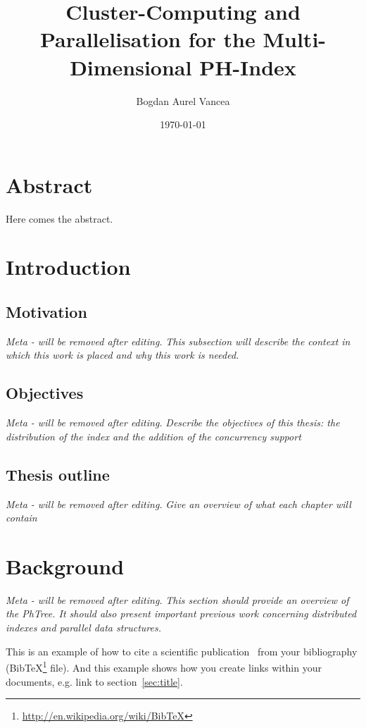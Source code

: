 \documentclass[11pt,a4paper]{globis-book}
\title{Cluster-Computing and Parallelisation for the
    Multi-Dimensional PH-Index}
\author{Bogdan Aurel Vancea}
\institute{Institute of Information Systems}
\date{\today}
\begin{document}
\frontmatter
\maketitlepage
\cleardoublepage
{}

\chapter*{Abstract}

Here comes the abstract.

\tableofcontents

\mainmatter


\chapter{Introduction}
\section{Motivation}
\textit{Meta - will be removed after editing.}
\textit{This subsection will describe the context in which this work is placed and why this work is needed.}

\section{Objectives}

\textit{Meta - will be removed after editing.}
\textit{Describe the objectives of this thesis: the distribution of the index and the addition of the concurrency support}
\section{Thesis outline}

\textit{Meta - will be removed after editing.}
\textit{Give an overview of what each chapter will contain}
\label{sec:title}

\chapter{Background}
\textit{Meta - will be removed after editing.}
\textit{This section should provide an overview of the PhTree. It should also present important previous work concerning distributed indexes and parallel data structures.}

This is an example of how to cite a scientific publication~\cite{murolo2013} from your bibliography (BibTeX\footnote{\url{http://en.wikipedia.org/wiki/BibTeX}} file). And this example shows how you create links within your documents, e.g. link to section~\ref{sec:title}.
\end{document}

